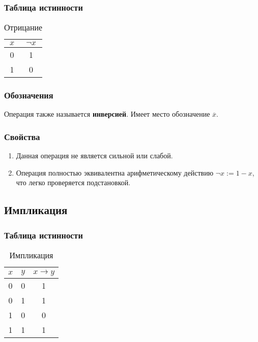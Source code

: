 \subsubsection{Таблица истинности}
\begin{table}[h]
	\begin{center}
		\begin{tabular}{|c|c|}
			\hline
			$x$ & $\neg x$\\
			\hline
			0 & 1\\
			\hline
			1 & 0\\
			\hline
		\end{tabular}
		\caption{Отрицание}
	\end{center}
\end{table}

\subsubsection{Обозначения}
Операция также называется \textbf{инверсией}. Имеет место обозначение $\overline{x}$.

\subsubsection{Свойства}
\begin{enumerate}
	\item Данная операция не является сильной или слабой.
	\item Операция полностью эквивалентна арифметическому действию $\neg{x} := 1 - x$, что легко проверяется подстановкой.
\end{enumerate}


\subsection{Импликация}
\subsubsection{Таблица истинности}
\begin{table}[h]
	\begin{center}
		\begin{tabular}{|c|c|c|}
			\hline
			$x$ & $y$ & $x\rightarrow y$\\
			\hline
			0 & 0 & 1\\
			\hline
			0 & 1 & 1\\
			\hline
			1 & 0 & 0\\
			\hline
			1 & 1 & 1\\
			\hline
		\end{tabular}
		\caption{Импликация}
	\end{center}
\end{table}

